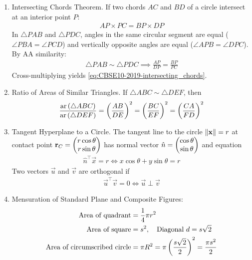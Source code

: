 \begin{enumerate}[label=\thesubsection.\arabic*, ref=\thesubsection.\theenumi]
	\item Intersecting Chords Theorem.
	If two chords $AC$ and $BD$ of a circle intersect at an interior point $P$:
	\begin{align}
		AP \times PC = BP \times DP \label{eq:CBSE10-2019-intersecting_chords}
	\end{align}
	\solution
	In $\triangle PAB$ and $\triangle PDC$, angles in the same circular segment are equal ($\angle PBA = \angle PCD$) and vertically opposite angles are equal ($\angle APB = \angle DPC$). By AA similarity:
	\begin{align}
		\triangle PAB \sim \triangle PDC \implies \frac{AP}{DP} = \frac{BP}{PC}
	\end{align}
	Cross-multiplying yields \eqref{eq:CBSE10-2019-intersecting_chords}.
	
	\item Ratio of Areas of Similar Triangles.
	If $\triangle ABC \sim \triangle DEF$, then
	\begin{align}
		\frac{\text{ar}\left(\triangle ABC\right)}{\text{ar}\left(\triangle DEF\right)} = \left(\frac{AB}{DE}\right)^2 = \left(\frac{BC}{EF}\right)^2 = \left(\frac{CA}{FD}\right)^2 \label{eq:CBSE10-2019-similar_triangle_area}
	\end{align}
	
	\item Tangent Hyperplane to a Circle.
	The tangent line to the circle $\left\lVert\mathbf{x}\right\rVert = r$ at contact point $\mathbf{r}_C = \begin{pmatrix}r\cos\theta \\ r\sin\theta\end{pmatrix}$ has normal vector $\hat{n} = \begin{pmatrix}\cos\theta \\ \sin\theta\end{pmatrix}$ and equation
	\begin{align}
		\hat{n}^\top \vec{x} = r \iff x\cos\theta + y\sin\theta = r \label{eq:CBSE10-2019-circle_tangent}
	\end{align}
	Two vectors $\vec{u}$ and $\vec{v}$ are orthogonal if
	\begin{align}
		\vec{u}^\top \vec{v} = 0 \iff \vec{u} \perp \vec{v} \label{eq:CBSE10-2019-orthogonality}
	\end{align}
	
	\item Mensuration of Standard Plane and Composite Figures:
	\begin{align}
		\text{Area of quadrant} &= \frac{1}{4}\pi r^2 \label{eq:CBSE10-2019-quadrant_area} \\
		\text{Area of square} &= s^2, \quad \text{Diagonal } d = s\sqrt{2} \label{eq:CBSE10-2019-square_geometry} \\
		\text{Area of circumscribed circle} &= \pi R^2 = \pi \left(\frac{s\sqrt{2}}{2}\right)^2 = \frac{\pi s^2}{2} \label{eq:CBSE10-2019-circumscribed_circle}
	\end{align}
	

\end{enumerate}
